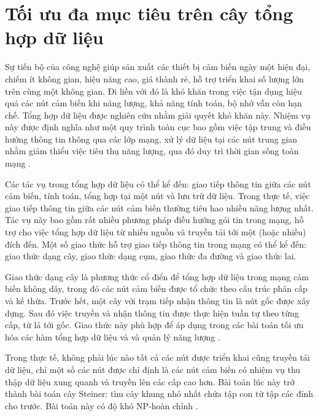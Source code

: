 \chapter{Tối ưu đa mục tiêu trên cây tổng hợp dữ liệu}
Sự tiến bộ của công nghệ giúp sản xuất các thiết bị cảm biến ngày một hiện đại, chiếm ít không gian, hiệu năng cao, giá thành rẻ, hỗ trợ triển khai số lượng lớn trên cùng một không gian. Đi liền với đó là khó khăn trong việc tận dụng hiệu quả các nút cảm biến khi năng lượng, khả năng tính toán, bộ nhớ vẫn còn hạn chế. Tổng hợp dữ liệu được nghiên cứu nhằm giải quyết khó khăn này. Nhiệm vụ này được định nghĩa như một quy trình toàn cục bao gồm việc tập trung và điều hướng thông tin thông qua các lớp mạng, xử lý dữ liệu tại các nút trung gian nhằm giảm thiểu việc tiêu thụ năng lượng, qua đó duy trì thời gian sống toàn mạng \cite{fasolo2007network}.


Các tác vụ trong tổng hợp dữ liệu có thể kể đến: giao tiếp thông tin giữa các nút cảm biến, tính toán, tổng hợp tại một nút và lưu trữ dữ liệu. Trong thực tế, việc giao tiếp thông tin giữa các nút cảm biến thường tiêu hao nhiều năng lượng nhất. Tác vụ này bao gồm rất nhiều phương pháp điều hướng gói tin trong mạng, hỗ trợ cho việc tổng hợp dữ liệu từ nhiều nguồn và truyền tải tới một (hoặc nhiều) đích đến. Một số giao thức hỗ trợ giao tiếp thông tin trong mạng có thể kể đến: giao thức dạng cây, giao thức dạng cụm, giao thức đa đường và giao thức lai.


Giao thức dạng cây là phương thức cổ điển để tổng hợp dữ liệu trong mạng cảm biến không dây, trong đó các nút cảm biến được tổ chức theo cấu trúc phân cấp và kế thừa. Trước hết, một cây với trạm tiếp nhận thông tin là nút gốc được xây dựng. Sau đó việc truyền và nhận thông tin được thực hiện tuần tự theo từng cấp, từ lá tới gốc. Giao thức này phù hợp để áp dụng trong các bài toán tối ưu hóa các hàm tổng hợp dữ liệu và và quản lý năng lượng \cite{fasolo2007network}. 


Trong thực tế, không phải lúc nào tất cả các nút được triển khai cũng truyền tải dữ liệu, chỉ một số các nút được chỉ định là các nút cảm biến có nhiệm vụ thu thập dữ liệu xung quanh và truyền lên các cấp cao hơn. Bài toán lúc này trở thành bài toán cây Steiner: tìm cây khung nhỏ nhất chứa tập con từ tập các đỉnh cho trước. Bài toán này có độ khó NP-hoàn chỉnh \cite{karp1972reducibility}.


